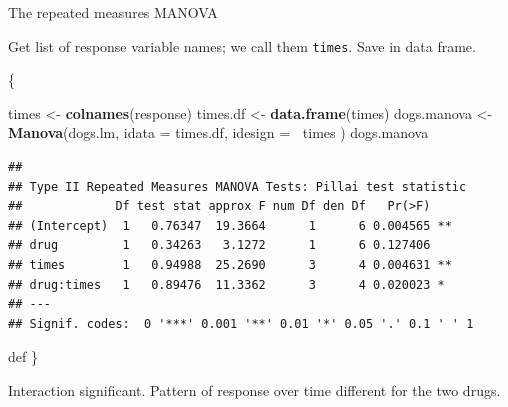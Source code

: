 \documentclass[ignorenonframetext,]{beamer}
\newenvironment{Shaded}{\begin{snugshade}}{\end{snugshade}}
\newcommand{\DataTypeTok}[1]{\textcolor[rgb]{0.13,0.29,0.53}{#1}}
\newcommand{\KeywordTok}[1]{\textcolor[rgb]{0.13,0.29,0.53}{\textbf{#1}}}
\newcommand{\NormalTok}[1]{#1}
\newcommand{\OperatorTok}[1]{\textcolor[rgb]{0.81,0.36,0.00}{\textbf{#1}}}
\newcommand{\StringTok}[1]{\textcolor[rgb]{0.31,0.60,0.02}{#1}}
\begin{document}
\begin{frame}[fragile]{The repeated measures MANOVA}
\protect\hypertarget{the-repeated-measures-manova}{}

Get list of response variable names; we call them \texttt{times}. Save
in data frame.

\{\footnotesize

\begin{Shaded}
\begin{Highlighting}[]
\NormalTok{times <-}\StringTok{ }\KeywordTok{colnames}\NormalTok{(response)}
\NormalTok{times.df <-}\StringTok{ }\KeywordTok{data.frame}\NormalTok{(times)}
\NormalTok{dogs.manova <-}\StringTok{ }\KeywordTok{Manova}\NormalTok{(dogs.lm,}
  \DataTypeTok{idata =}\NormalTok{ times.df,}
  \DataTypeTok{idesign =} \OperatorTok{~}\NormalTok{times}
\NormalTok{)}
\NormalTok{dogs.manova}
\end{Highlighting}
\end{Shaded}

\begin{verbatim}
## 
## Type II Repeated Measures MANOVA Tests: Pillai test statistic
##             Df test stat approx F num Df den Df   Pr(>F)   
## (Intercept)  1   0.76347  19.3664      1      6 0.004565 **
## drug         1   0.34263   3.1272      1      6 0.127406   
## times        1   0.94988  25.2690      3      4 0.004631 **
## drug:times   1   0.89476  11.3362      3      4 0.020023 * 
## ---
## Signif. codes:  0 '***' 0.001 '**' 0.01 '*' 0.05 '.' 0.1 ' ' 1
\end{verbatim}

def \}

Interaction significant. Pattern of response over time different for the
two drugs.

\end{frame}
\end{document}
